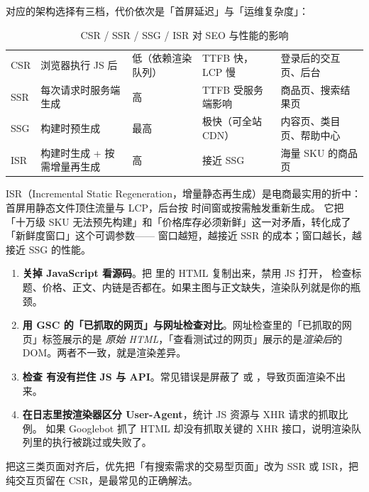 对应的架构选择有三档，代价依次是「首屏延迟」与「运维复杂度」：

\begin{table}[htbp]
\centering
\caption{CSR / SSR / SSG / ISR 对 SEO 与性能的影响}
\label{tab:render}
\small
\begin{tabularx}{\textwidth}{L{1.7cm} L{2.5cm} L{2.7cm} L{2.6cm} Y}
\toprule
{} &  &  &  &  \\
\midrule
CSR & 浏览器执行 JS 后 & 低（依赖渲染队列） & TTFB 快，LCP 慢 & 登录后的交互页、后台 \\
SSR & 每次请求时服务端生成 & 高 & TTFB 受服务端影响 & 商品页、搜索结果页 \\
SSG & 构建时预生成 & 最高 & 极快（可全站 CDN） & 内容页、类目页、帮助中心 \\
ISR & 构建时生成 + 按需增量再生成 & 高 & 接近 SSG & 海量 SKU 的商品页 \\
\bottomrule
\end{tabularx}
\end{table}

ISR（Incremental Static Regeneration，增量静态再生成）是电商最实用的折中：
首屏用静态文件顶住流量与 LCP，后台按  时间窗或按需触发重新生成。
它把「十万级 SKU 无法预先构建」和「价格库存必须新鲜」这一对矛盾，转化成了「新鲜度窗口」这个可调参数——
窗口越短，越接近 SSR 的成本；窗口越长，越接近 SSG 的性能。

\begin{toolbox}
\begin{enumerate}
  \item \textbf{关掉 JavaScript 看源码}。把  里的 HTML 复制出来，禁用 JS 打开，
        检查标题、价格、正文、内链是否都在。如果主图与正文缺失，渲染队列就是你的瓶颈。
  \item \textbf{用 GSC 的「已抓取的网页」与网址检查对比}。网址检查里的「已抓取的网页」标签展示的是
        \emph{原始 HTML}，「查看测试过的网页」展示的是\emph{渲染后}的 DOM。两者不一致，就是渲染差异。
  \item \textbf{检查  有没有拦住 JS 与 API}。常见错误是屏蔽了  或
        ，导致页面渲染不出来。
  \item \textbf{在日志里按渲染器区分 User-Agent}，统计 JS 资源与 XHR 请求的抓取比例。
        如果 Googlebot 抓了 HTML 却没有抓取关键的 XHR 接口，说明渲染队列里的执行被跳过或失败了。
\end{enumerate}
把这三类页面对齐后，优先把「有搜索需求的交易型页面」改为 SSR 或 ISR，把纯交互页留在 CSR，是最常见的正确解法。
\end{toolbox}

